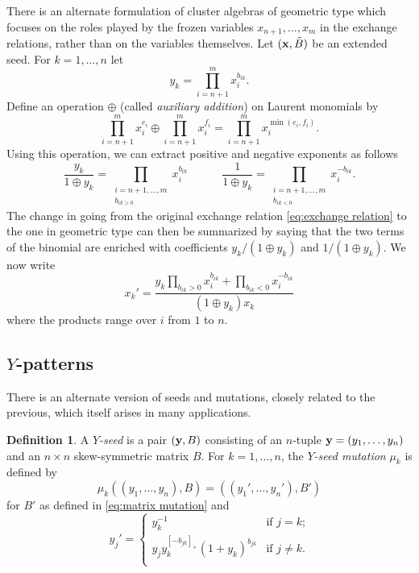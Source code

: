 \documentclass{amsart}
\theoremstyle{definition}
\newtheorem{definition}[theorem]{Definition}
\theoremstyle{remark}
\numberwithin{equation}{section}
\newcommand{\x}{{\bf x}}
\newcommand{\y}{{\bf y}}
\begin{document}
	There is an alternate formulation of cluster algebras of geometric type which focuses on the roles played by the frozen variables $x_{n+1},\ldots, x_m$ in the exchange relations, rather than on the variables themselves.  Let $(\x, \tilde{B})$ be an extended seed.  For $k=1,\ldots, n$ let 
	\begin{displaymath}
	y_k = \prod_{i=n+1}^m x_i^{b_{ik}}.
	\end{displaymath}
	Define an operation $\oplus$ (called \emph{auxiliary addition}) on Laurent monomials by
	\begin{displaymath}
	\prod_{i=n+1}^m x_i^{e_i} \oplus \prod_{i=n+1}^m x_i^{f_i} = \prod_{i=n+1}^m x_i^{\min(e_i,f_i)}.
	\end{displaymath}
	Using this operation, we can extract positive and negative exponents as follows
	\begin{displaymath}
	\frac{y_k}{1 \oplus y_k} = \prod_{\substack{i=n+1,\ldots, m\\ b_{ik > 0}}} x_i^{b_{ik}}
	\quad \quad \quad \frac{1}{1 \oplus y_k} = \prod_{\substack{i=n+1,\ldots, m\\ b_{ik < 0}}} x_i^{-b_{ik}}.
	\end{displaymath}
	The change in going from the original exchange relation \eqref{eq:exchange relation} to the one in geometric type can then be summarized by saying that the two terms of the binomial are enriched with coefficients $y_k/(1 \oplus y_k)$ and $1/(1 \oplus y_k)$.  We now write
	\begin{displaymath} 
		x_k' = \frac{y_k\prod_{b_{ik}>0} x_i^{b_{ik}} + \prod_{b_{ik}<0} x_i^{-b_{ik}}}{(1 \oplus y_k)x_k}
	\end{displaymath}
	where the products range over $i$ from $1$ to $n$.
	
	\subsection{$Y$-patterns}
	There is an alternate version of seeds and mutations, closely related to the previous, which itself arises in many applications.  
	
	\begin{definition}
		A \emph{$Y$-seed} is a pair $(\y,B)$ consisting of an $n$-tuple $\y=(y_1,\ldots, y_n)$ and an $n\times n$ skew-symmetric matrix $B$.  For $k=1,\ldots, n$, the \emph{$Y$-seed mutation} $\mu_k$ is defined by
		\begin{displaymath}
			\mu_k((y_1,\ldots, y_n),B) = ((y_1',\ldots, y_n'),B')
		\end{displaymath}
		for $B'$ as defined in \eqref{eq:matrix mutation} and 
		\begin{equation}\label{eq:y mutation}
		y_j' = \begin{cases}
		y_k^{-1} & \text{if $j = k$;} \\
		y_jy_k^{[-b_{jk}]_+}(1+y_k)^{b_{jk}} & \text{if $j \neq k$.} \\
		\end{cases}
		\end{equation}
	\end{definition}
	
\end{document}

